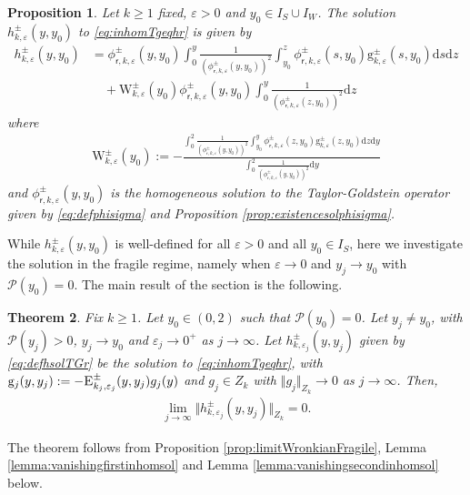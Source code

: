\documentclass[11pt,reqno]{amsproc}
\newtheorem{proposition}{Proposition}[section]
\newtheorem{theorem}[proposition]{Theorem}
\theoremstyle{definition}
\numberwithin{equation}{section}
\newcommand{\sr}{{\mathsf{r}}}
\renewcommand{\d}{\mathrm{d}}
\newcommand{\ep}{\varepsilon}
\renewcommand{\P}{{\mathcal{P}}}
\begin{document}
\begin{proposition}\label{prop:defhsolTGr}
Let $k\geq 1$ fixed, $\ep>0$ and $y_0\in I_S\cup I_W$. The solution $h_{k,\ep}^\pm(y,y_0)$ to \eqref{eq:inhomTgeqhr} is given by
\begin{equation}\label{eq:defhsolTGr}
\begin{split}
h_{k,\ep}^\pm(y,y_0) &= \phi_{\sr,k,\ep}^\pm(y,y_0) \int_0^y \frac{1}{(\phi_{\sr,k,\ep}^\pm(y,y_0))^2} \int_{y_0}^z \phi_{\sr,k,\ep}^\pm(s,y_0) \mathrm{g}_{k,\ep}^\pm(s,y_0) \d s \d z \\
&\quad+ \mathrm{W}_{k,\ep}^\pm(y_0) \phi_{\sr,k,\ep}^\pm(y,y_0)\int_0^y \frac{1}{(\phi_{\sr,k,\ep}^\pm(z,y_0))^2} \d z
\end{split}
\end{equation}
where
\begin{align*}
\mathrm{W}_{k,\ep}^\pm(y_0) := -\frac{\int_0^2 \frac{1}{(\phi_{\sr,k,\ep}^\pm(y,y_0))^2} \int_{y_0}^y \phi_{\sr,k,\ep}^\pm(z,y_0) \mathrm{g}_{k,\ep}^\pm(z,y_0) \d z \d y }{\int_0^2 \frac{1}{(\phi_{\sr,k,\ep}^\pm(y,y_0))^2} \d y}
\end{align*}
and $\phi_{\sr,k,\ep}^\pm(y,y_0)$ is the homogeneous solution to the Taylor-Goldstein operator given by \eqref{eq:defphisigma} and Proposition \ref{prop:existencesolphisigma}.
\end{proposition}

While $h_{k,\ep}^\pm(y,y_0)$ is well-defined for all $\ep>0$ and all $y_0\in I_S$, here we investigate the solution in the fragile regime, namely when $\ep\rightarrow 0$ and $y_j\rightarrow y_0$ with $\P(y_0)=0$. The main result of the section is the following.

\begin{theorem}\label{thm:vanishinghjfragile}
Fix $k\geq 1$. Let $y_0\in (0,2)$ such that $\P(y_0)=0$. Let $y_j\neq y_0$, with $\P(y_j)>0$, $y_j\rightarrow y_0$ and $\ep_j\rightarrow 0^+$ as $j\rightarrow \infty$. Let $h_{k,\ep_j}^\pm(y,y_j)$ given by \eqref{eq:defhsolTGr} be the solution to \eqref{eq:inhomTgeqhr}, with  $\mathrm{g}_j(y,y_j):=-\textsc{E}_{k_j,\ep_j}^\pm(y,y_j) g_j(y)$ and $g_j\in Z_k$ with $\Vert g_j \Vert_{Z_k}\rightarrow 0$ as $j\rightarrow \infty$. Then,
\begin{align*}
\lim_{j\rightarrow \infty} \Vert h_{k,\ep_j}^\pm(y,y_j) \Vert_{Z_k} = 0.
\end{align*}
\end{theorem}
The theorem follows from Proposition \ref{prop:limitWronkianFragile},  Lemma  \ref{lemma:vanishingfirstinhomsol} and Lemma \ref{lemma:vanishingsecondinhomsol} below.
\end{document}
